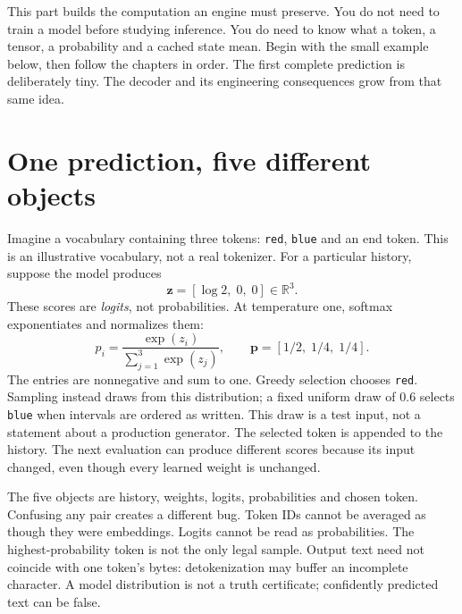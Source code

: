 \begin{ChapterIntent}
This part builds the computation an engine
must preserve. You do not need to train a model before studying inference.
You do need to know what a token, a tensor, a probability and a cached state
mean. Begin with the small example below, then follow the chapters in order.
The first complete prediction is deliberately tiny. The decoder and its
engineering consequences grow from that same idea.
\end{ChapterIntent}

\section*{One prediction, five different objects}
Imagine a vocabulary containing three tokens: \texttt{red}, \texttt{blue}
and an end token. This is an illustrative vocabulary, not a real tokenizer.
For a particular history, suppose the model produces
\[
 \mathbf{z}=[\log 2,\;0,\;0]\in\mathbb{R}^{3}.
\]
These scores are \emph{logits}, not probabilities. At temperature one,
softmax exponentiates and normalizes them:
\[
 p_i=\frac{\exp(z_i)}{\sum_{j=1}^{3}\exp(z_j)},\qquad
 \mathbf{p}=[1/2,\;1/4,\;1/4].
\]
The entries are nonnegative and sum to one. Greedy selection chooses
\texttt{red}. Sampling instead draws from this distribution; a fixed uniform
draw of $0.6$ selects \texttt{blue} when intervals are ordered as written.
This draw is a test input, not a statement about a production generator.
The selected token is appended to the history. The next evaluation can
produce different scores because its input changed, even though every
learned weight is unchanged.

The five objects are history, weights, logits, probabilities and chosen
token. Confusing any pair creates a different bug. Token IDs cannot be
averaged as though they were embeddings. Logits cannot be read as
probabilities. The highest-probability token is not the only legal sample.
Output text need not coincide with one token's bytes: detokenization may
buffer an incomplete character. A model distribution is not a truth
certificate; confidently predicted text can be false.

\begingroup
\setcounter{figure}{0}
\renewcommand{\thefigure}{I.\arabic{figure}}
\endgroup

